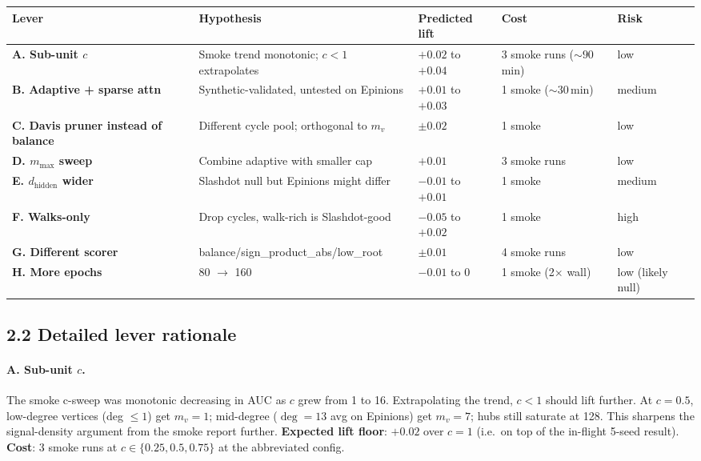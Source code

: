 \documentclass[a4paper,11pt]{article}
\begin{document}
\begin{center}
\small
\begin{tabular}{lllll}
\toprule
Lever & Hypothesis & Predicted lift & Cost & Risk \\
\midrule
\textbf{A. Sub-unit $c$} & Smoke trend monotonic; $c<1$ extrapolates & $+0.02$ to $+0.04$ & 3 smoke runs ($\sim 90$\,min) & low \\
\textbf{B. Adaptive + sparse attn} & Synthetic-validated, untested on Epinions & $+0.01$ to $+0.03$ & 1 smoke ($\sim 30$\,min) & medium \\
\textbf{C. Davis pruner instead of balance} & Different cycle pool; orthogonal to $m_v$ & $\pm 0.02$ & 1 smoke & low \\
\textbf{D. $m_\text{max}$ sweep} & Combine adaptive with smaller cap & $+0.01$ & 3 smoke runs & low \\
\textbf{E. $d_\text{hidden}$ wider} & Slashdot null but Epinions might differ & $-0.01$ to $+0.01$ & 1 smoke & medium \\
\textbf{F. Walks-only} & Drop cycles, walk-rich is Slashdot-good & $-0.05$ to $+0.02$ & 1 smoke & high \\
\textbf{G. Different scorer} & balance/sign\_product\_abs/low\_root & $\pm 0.01$ & 4 smoke runs & low \\
\textbf{H. More epochs} & 80 $\to$ 160 & $-0.01$ to $0$ & 1 smoke (2$\times$ wall) & low (likely null) \\
\bottomrule
\end{tabular}
\end{center}

\subsection*{2.2 Detailed lever rationale}

\paragraph{A. Sub-unit $c$.}  The smoke c-sweep was monotonic
decreasing in AUC as $c$ grew from 1 to 16.  Extrapolating the
trend, $c < 1$ should lift further.  At $c{=}0.5$, low-degree
vertices (deg $\le 1$) get $m_v = 1$; mid-degree ($\deg{=}13$ avg
on Epinions) get $m_v = 7$; hubs still saturate at 128.  This
sharpens the signal-density argument from the smoke report further.
\textbf{Expected lift floor}: $+0.02$ over $c{=}1$ (i.e.\ on top of
the in-flight 5-seed result).  \textbf{Cost}: 3 smoke runs at
$c \in \{0.25, 0.5, 0.75\}$ at the abbreviated config.
\end{document}
